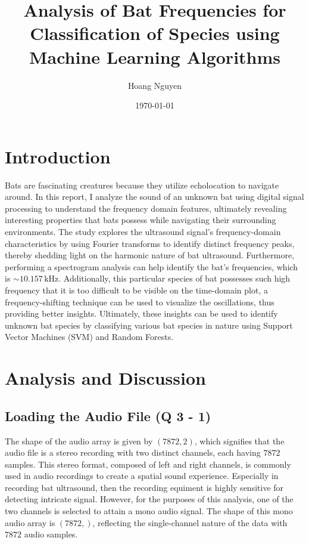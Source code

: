\documentclass[12pt]{article}
\title{Analysis of Bat Frequencies for Classification of Species using Machine Learning Algorithms}
\author{Hoang Nguyen}
\date{\today}
\begin{document}
\maketitle

\section{Introduction}
    \text Bats are fascinating creatures because they utilize echolocation to navigate around. In this report, I analyze the sound of an unknown bat using digital signal processing to understand the frequency domain features, ultimately revealing interesting properties that bats possess while navigating their surrounding environments. The study explores the ultrasound signal's frequency-domain characteristics by using Fourier transforms to identify distinct frequency peaks, thereby shedding light on the harmonic nature of bat ultrasound. Furthermore, performing a spectrogram analysis can help identify the bat's frequencies, which is $\sim10.157\,\text{kHz}$. Additionally, this particular species of bat possesses such high frequency that it is too difficult to be visible on the time-domain plot, a frequency-shifting technique can be used to visualize the oscillations, thus providing better insights. Ultimately, these insights can be used to identify unknown bat species by classifying various bat species in nature using Support Vector Machines (SVM) and Random Forests.
    
\section{Analysis and Discussion}
\subsection{Loading the Audio File (Q 3 - 1)}
The shape of the audio array is given by $(7872, 2)$, which signifies that the audio file is a stereo recording with two distinct channels, each having $7872$ samples. This stereo format, composed of left and right channels, is commonly used in audio recordings to create a spatial sound experience. Especially in recording bat ultrasound, then the recording equiment is highly sensitive for detecting intricate signal. However, for the purposes of this analysis, one of the two channels is selected to attain a mono audio signal. The shape of this mono audio array is $(7872,)$, reflecting the single-channel nature of the data with $7872$ audio samples.
\end{document}
